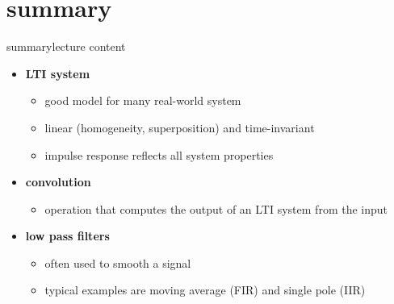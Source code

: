     \section{summary}
        \begin{frame}{summary}{lecture content}
            \begin{itemize}
                \item   \textbf{LTI system}
                    \begin{itemize}
                        \item   good model for many real-world system
                        \item   linear (homogeneity, superposition) and time-invariant
                        \item   impulse response reflects all system properties
                    \end{itemize}
                \bigskip
                \item  \textbf{convolution}
                    \begin{itemize}
                        \item   operation that computes the output of an LTI system from the input
                    \end{itemize}
                \bigskip
                \item      \textbf{low pass filters}
                    \begin{itemize}
                        \item   often used to smooth a signal
                        \item   typical examples are moving average (FIR) and single pole (IIR)
                    \end{itemize}
            \end{itemize}
        \end{frame}

